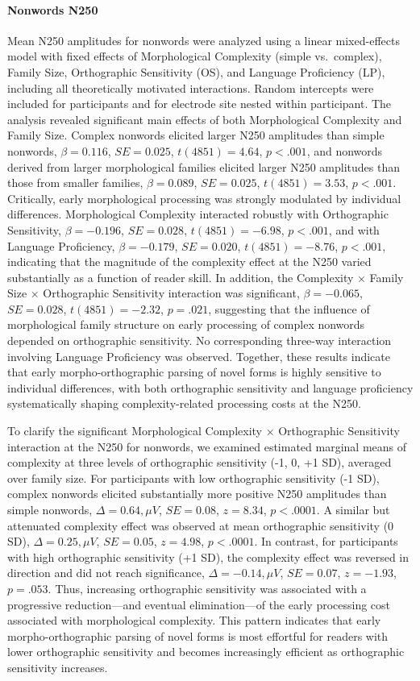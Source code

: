 \documentclass[utf8]{FrontiersinHarvard} %
\begin{document}
\paragraph*{Nonwords N250}
Mean N250 amplitudes for nonwords were analyzed using a linear mixed-effects model with fixed effects of Morphological Complexity (simple vs.\ complex), Family Size, Orthographic Sensitivity (OS), and Language Proficiency (LP), including all theoretically motivated interactions. Random intercepts were included for participants and for electrode site nested within participant. The analysis revealed significant main effects of both Morphological Complexity and Family Size. Complex nonwords elicited larger N250 amplitudes than simple nonwords, $\beta = 0.116$, $SE = 0.025$, $t(4851) = 4.64$, $p < .001$, and nonwords derived from larger morphological families elicited larger N250 amplitudes than those from smaller families, $\beta = 0.089$, $SE = 0.025$, $t(4851) = 3.53$, $p < .001$. Critically, early morphological processing was strongly modulated by individual differences. Morphological Complexity interacted robustly with Orthographic Sensitivity, $\beta = -0.196$, $SE = 0.028$, $t(4851) = -6.98$, $p < .001$, and with Language Proficiency, $\beta = -0.179$, $SE = 0.020$, $t(4851) = -8.76$, $p < .001$, indicating that the magnitude of the complexity effect at the N250 varied substantially as a function of reader skill. In addition, the Complexity × Family Size × Orthographic Sensitivity interaction was significant, $\beta = -0.065$, $SE = 0.028$, $t(4851) = -2.32$, $p = .021$, suggesting that the influence of morphological family structure on early processing of complex nonwords depended on orthographic sensitivity. No corresponding three-way interaction involving Language Proficiency was observed. Together, these results indicate that early morpho-orthographic parsing of novel forms is highly sensitive to individual differences, with both orthographic sensitivity and language proficiency systematically shaping complexity-related processing costs at the N250.

To clarify the significant Morphological Complexity × Orthographic Sensitivity interaction at the N250 for nonwords, we examined estimated marginal means of complexity at three levels of orthographic sensitivity (-1, 0, +1 SD), averaged over family size. For participants with low orthographic sensitivity (-1 SD), complex nonwords elicited substantially more positive N250 amplitudes than simple nonwords, $\Delta = 0.64,\mu V$, $SE = 0.08$, $z = 8.34$, $p < .0001$. A similar but attenuated complexity effect was observed at mean orthographic sensitivity (0 SD), $\Delta = 0.25,\mu V$, $SE = 0.05$, $z = 4.98$, $p < .0001$. In contrast, for participants with high orthographic sensitivity (+1 SD), the complexity effect was reversed in direction and did not reach significance, $\Delta = -0.14,\mu V$, $SE = 0.07$, $z = -1.93$, $p = .053$. Thus, increasing orthographic sensitivity was associated with a progressive reduction—and eventual elimination—of the early processing cost associated with morphological complexity. This pattern indicates that early morpho-orthographic parsing of novel forms is most effortful for readers with lower orthographic sensitivity and becomes increasingly efficient as orthographic sensitivity increases.
\end{document}
